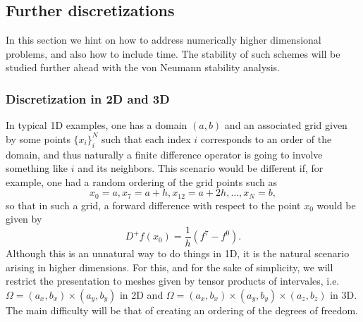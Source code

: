 \documentclass{article}
\begin{document}
\subsection{Further discretizations}
In this section we hint on how to address numerically higher dimensional problems, and also how to include time. The stability of such schemes will be studied further ahead with the von Neumann stability analysis. 
\subsubsection{Discretization in 2D and 3D}
In typical 1D examples, one has a domain $(a,b)$ and an associated grid given by some points $\{x_i\}_i^N$ such that each index $i$ corresponds to an order of the domain, and thus naturally a finite difference operator is going to involve something like $i$ and its neighbors. This scenario would be different if, for example, one had a random ordering of the grid points such as
    $$ x_0 = a, x_7 = a + h, x_12 = a + 2h, \hdots, x_N = b, $$
so that in such a grid, a forward difference with respect to the point $x_0$ would be given by
    $$ D^+f(x_0) = \frac 1 h \left( f^7 - f^0 \right). $$
    Although this is an unnatural way to do things in 1D, it is the natural scenario arising in higher dimensions. For this, and for the sake of simplicity, we will restrict the presentation to meshes given by tensor products of intervales, i.e. $\Omega = (a_x, b_x) \times (a_y, b_y)$ in 2D and $\Omega = (a_x, b_x) \times (a_y, b_y) \times (a_z, b_z)$ in 3D. The main difficulty will be that of creating an ordering of the degrees of freedom.
\end{document}
